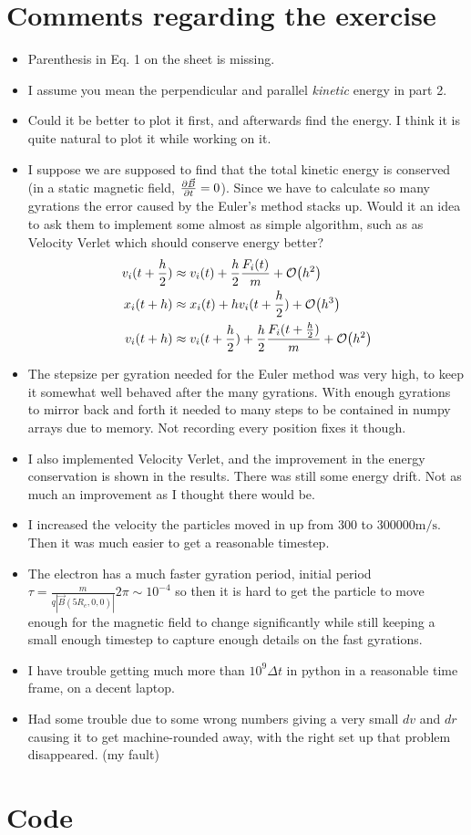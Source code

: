 \documentclass[x11names]{article}
\renewcommand{\va}{\vec}
\begin{document}
\section{Comments regarding the exercise}
      \begin{itemize}
            \item Parenthesis in Eq. 1 on the sheet is missing.
            \item I assume you mean the perpendicular and parallel \textit{kinetic} energy in part 2.
            \item Could it be better to plot it first, and afterwards find the energy. I think it is quite natural to plot it while working on it.
            \item I suppose we are supposed to find that the total kinetic energy is conserved (in a static magnetic field, \(\pdv{\va{B}}{t} = 0\)). Since we have to calculate so many gyrations the error caused by the Euler's method stacks up. Would it an idea to ask them to implement some almost as simple algorithm, such as as Velocity Verlet which should conserve energy better? 
            \begin{align*}
              v_i(t+\frac{h}{2}) &\approx v_i(t)  + \frac{h}{2}\frac{F_i(t)}{m} + \order{h^2} 
              \\
              x_i(t+h) &\approx x_i(t) + hv_i(t+ \frac{h} {2} ) + \order{h ^ 3}
              \\
              v_i(t+h) &\approx v_i(t+\frac{h}{2})  +  \frac{h}{2}\frac{F_i(t+ \frac{h}{2})}{m} + \order{h^2} 
            \end{align*}
            \item The stepsize per gyration needed for the Euler method was very high, to keep it somewhat well behaved after the many gyrations. With enough gyrations to mirror back and forth it needed to many steps to be contained in numpy arrays due to memory. Not recording every position fixes it though.
            \item I also implemented Velocity Verlet, and the improvement in the energy conservation is shown in the results. There was still some energy drift. Not as much an improvement as I thought there would be.
            \item I increased the velocity the particles moved in up from \(300\) to \(300 000 \si{\meter\per\second}\). Then it was much easier to get a reasonable timestep.
            \item The electron has a much faster gyration period, initial period \( \tau = \frac{m}{q|\va{B}( 5R_e, 0, 0 )|} 2\pi \sim 10^{-4}\) so then it is hard to get the particle to move enough for the magnetic field to change significantly while still keeping a small enough timestep to capture enough details on the fast gyrations.
            \item I have trouble getting much more than \(10^9 \Delta t\) in python in a reasonable time frame, on a decent laptop.
            \item Had some trouble due to some wrong numbers giving a very small \(dv\) and \(dr\) causing it to get machine-rounded away, with the right set up that problem disappeared. (my fault)
      \end{itemize}


\section{Code}
  \label{sec:code}
  

      
\end{document}
